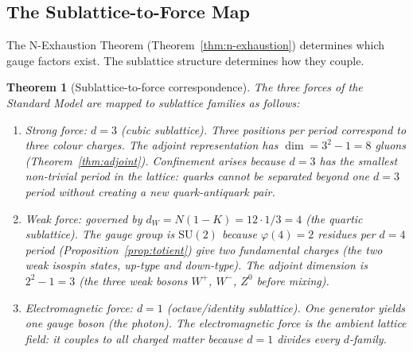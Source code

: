 \documentclass[11pt,a4paper]{article}
\newtheorem{theorem}{Theorem}[section]
\theoremstyle{definition}
\theoremstyle{remark}
\begin{document}
\subsection{The Sublattice-to-Force Map}\label{subsec:force-map}

The N-Exhaustion Theorem (Theorem~\ref{thm:n-exhaustion}) determines which gauge factors exist. The sublattice structure determines how they couple.

\begin{theorem}[Sublattice-to-force correspondence]\label{thm:force-map}
The three forces of the Standard Model are mapped to sublattice families as follows:
\begin{enumerate}[label=\textnormal{(\roman*)},leftmargin=*]
\item \emph{Strong force:} $d = 3$ (cubic sublattice). Three positions per period correspond to three colour charges. The adjoint representation has $\dim = 3^{2}-1 = 8$ gluons (Theorem~\ref{thm:adjoint}). Confinement arises because $d=3$ has the smallest non-trivial period in the lattice: quarks cannot be separated beyond one $d=3$ period without creating a new quark-antiquark pair.
\item \emph{Weak force:} governed by $d_{W} = N(1-K) = 12 \cdot 1/3 = 4$ (the quartic sublattice). The gauge group is $\mathrm{SU}(2)$ because $\varphi(4) = 2$ residues per $d=4$ period (Proposition~\ref{prop:totient}) give two fundamental charges (the two weak isospin states, up-type and down-type). The adjoint dimension is $2^{2}-1 = 3$ (the three weak bosons $W^{+}$, $W^{-}$, $Z^{0}$ before mixing).
\item \emph{Electromagnetic force:} $d = 1$ (octave/identity sublattice). One generator yields one gauge boson (the photon). The electromagnetic force is the ambient lattice field: it couples to all charged matter because $d=1$ divides every $d$-family.
\end{enumerate}
\end{theorem}
\end{document}
